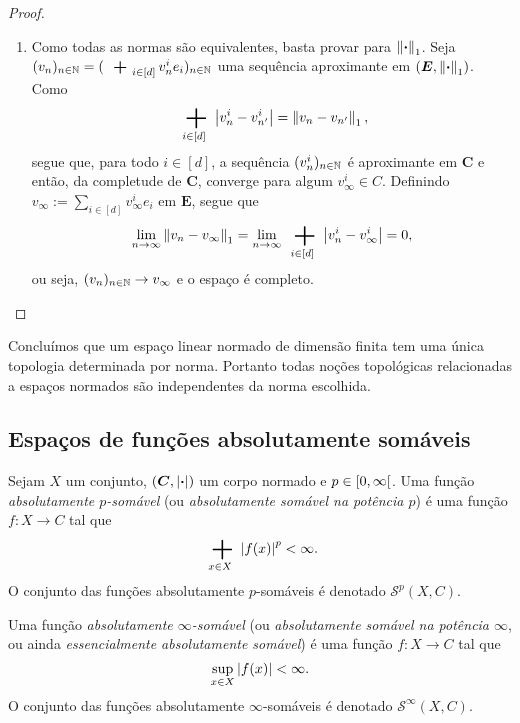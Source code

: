\begin{proof}
\begin{enumerate}
	\item Como todas as normas são equivalentes, basta provar para $\left\Vert{\bm{\cdot}}\right\Vert_1$. Seja $(v_n)_{n \in \N} = (\sum_{i \in [d]} v_n^i e_i)_{n \in \N}$ uma sequência aproximante em $(\bm E,\left\Vert{\bm{\cdot}}\right\Vert_1)$. Como
		\begin{equation*}
		\sum_{i \in [d]} \abs{v_n^i - v_{n'}^i} = \nor{v_n - v_{n'}}_1,
		\end{equation*}
segue que, para todo $i \in [d]$, a sequência $(v_n^i)_{n \in \mathbb{N}}$ é aproximante em $\bm C$ e então, da completude de $\bm C$, converge para algum $v_\infty^i \in C$. Definindo $v_\infty := \sum_{i \in [d]} v_\infty^ie_i$ em $\bm E$, segue que
	\begin{equation*}
	\lim_{n \conv \infty} \nor{v_n - v_\infty}_1 = \lim_{n \conv \infty} \sum_{i \in [d]} \abs{v_n^i - v_\infty^i} = 0,
	\end{equation*}
ou seja, $(v_n)_{n \in \mathbb{N}} \rightarrow v_\infty$ e o espaço é completo.	
	\end{enumerate}
\end{proof}

Concluímos que um espaço linear normado de dimensão finita tem uma única topologia determinada por norma.
Portanto todas noções topológicas relacionadas a espaços normados são independentes da norma escolhida.














\subsection{Espaços de funções absolutamente somáveis}

\newcommand{\Smvl}{\mathscr{S}}

\begin{definition}
Sejam $X$ um conjunto, $(\bm C,\left\vert{\bm{\cdot}}\right\vert)$ um corpo normado
 e $p \in \left[{0},{\infty}\right[$. Uma função \emph{absolutamente $p$-somável} (ou \emph{absolutamente somável na potência $p$}) é uma função $f\colon X \to C$ tal que
	\begin{equation*}
	\sum_{x \in X} \abs{f(x)}^p < \infty.
	\end{equation*}
O conjunto das funções absolutamente $p$-somáveis é denotado $\Smvl^p(X,C)$.

Uma função \emph{absolutamente $\infty$-somável} (ou \emph{absolutamente somável na potência $\infty$}, ou ainda \emph{essencialmente absolutamente somável}) é uma função $f\colon X \to C$ tal que
	\begin{equation*}
	\sup_{x \in X} \left\vert{f(x)}\right\vert < \infty.
	\end{equation*}
O conjunto das funções absolutamente $\infty$-somáveis é denotado $\Smvl^\infty(X,C)$.
\end{definition}


